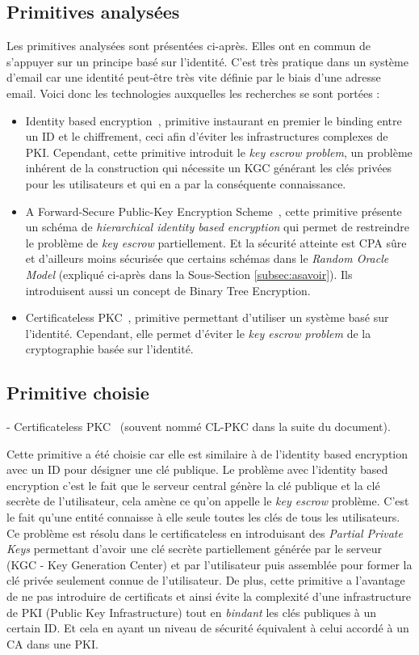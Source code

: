 \subsection{Primitives analysées}
Les primitives analysées sont présentées ci-après. Elles ont en commun de s'appuyer sur un principe basé sur l'identité. C'est très pratique dans un système d'email car une identité peut-être très vite définie par le biais d'une adresse email. Voici donc les technologies auxquelles les recherches se sont portées :
\begin{itemize}
	\item Identity based encryption~\cite{conf/crypto/Shamir84}, primitive instaurant en premier le binding entre un ID et le chiffrement, ceci afin d'éviter les infrastructures complexes de PKI. Cependant, cette primitive introduit le \textit{key escrow problem}, un problème inhérent de la construction qui nécessite un KGC générant les clés privées pour les utilisateurs et qui en a par la conséquente connaissance.
	\item A Forward-Secure Public-Key Encryption Scheme~\cite{conf/eurocrypt/CanettiHK03}, cette primitive présente un schéma de \textit{hierarchical identity based encryption} qui permet de restreindre le problème de \textit{key escrow} partiellement. Et la sécurité atteinte est CPA sûre et d'ailleurs moins sécurisée que certains schémas dans le \textit{Random Oracle Model} (expliqué ci-après dans la Sous-Section \ref{subsec:asavoir}). Ils introduisent aussi un concept de Binary Tree Encryption.
	\item Certificateless PKC~\cite{conf/asiacrypt/Al-RiyamiP03}, primitive permettant d'utiliser un système basé sur l'identité. Cependant, elle permet d'éviter le \textit{key escrow problem} de la cryptographie basée sur l'identité.
\end{itemize}
\subsection{Primitive choisie}
- Certificateless PKC~\cite{conf/asiacrypt/Al-RiyamiP03} (souvent nommé CL-PKC dans la suite du document).

 Cette primitive a été choisie car elle est similaire à de l'identity based encryption avec un ID pour désigner une clé publique. Le problème avec l'identity based encryption c'est le fait que le serveur central génère la clé publique et la clé secrète de l'utilisateur, cela amène ce qu'on appelle le \textit{key escrow} problème. C'est le fait qu'une entité connaisse à elle seule toutes les clés de tous les utilisateurs. Ce problème est résolu dans le certificateless en introduisant des \textit{Partial Private Keys} permettant d'avoir une clé secrète partiellement générée par le serveur (KGC - Key Generation Center) et par l'utilisateur puis assemblée pour former la clé privée seulement connue de l'utilisateur. De plus, cette primitive a l'avantage de ne pas introduire de certificats et ainsi évite la complexité d'une infrastructure de PKI (Public Key Infrastructure) tout en \textit{bindant} les clés publiques à un certain ID. Et cela en ayant un niveau de sécurité équivalent à celui accordé à un CA dans une PKI.
